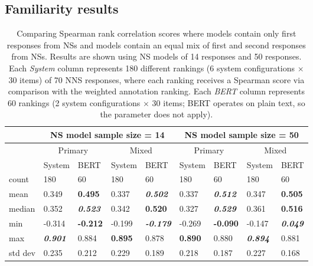 \subsection{Familiarity results}
\label{sec:familiarity-results}

\begin{table}[htb!]
\begin{center}
\begin{tabular}{|l||l|l||l|l||l|l||l|l|}
\hline
 & \multicolumn{4}{c||}{NS model sample size = 14} & \multicolumn{4}{c|}{NS model sample size = 50} \\
 \hline
 & \multicolumn{2}{c||}{Primary} & \multicolumn{2}{c||}{Mixed} & \multicolumn{2}{c||}{Primary} & \multicolumn{2}{c|}{Mixed} \\
\hline
		& System & BERT 	& System 	& BERT 						& System & BERT 	& System & BERT \\
\hline
\hline
count 	& 180 	& 60 		& 180 		& 60 						& 180 	& 60 		& 180 & 60 \\
\hline
mean 	& 0.349 & \textbf{0.495} & 0.337 & \textit{\textbf{0.502}} 	& 0.337 & \textit{\textbf{0.512}} 	& 0.347 & \textbf{0.505} \\
\hline
median 	& 0.352 & \textit{\textbf{0.523}} & 0.342 & \textbf{0.520}  & 0.327 & \textit{\textbf{0.529}} 	& 0.361 & \textbf{0.516}  \\
\hline
min & -0.314 & \textbf{-0.212} & -0.199 & \textit{\textbf{-0.179}}  & -0.269 & \textbf{-0.090} 	& -0.147 & \textit{\textbf{0.049}}  \\
\hline
max & \textit{\textbf{0.901}} & 0.884 & \textbf{0.895} & 0.878 		& \textbf{0.890} & 0.880 	& \textit{\textbf{0.894}} & 0.881 \\
\hline
std dev & 0.235 & 0.212 	& 0.229 	& 0.189 					& 0.218 & 0.187 	& 0.227 & 0.168 \\
\hline
\end{tabular}
\caption{\label{tab:primacy-results} Comparing Spearman rank correlation scores where  models contain only first responses from NSs and  models contain an equal mix of first and second responses from NSs. Results are shown using NS models of 14 responses and 50 responses. Each \textit{System} column represents 180 different rankings (6 system configurations $\times$ 30 items) of 70 NNS responses, where each ranking receives a Spearman score via comparison with the weighted annotation ranking. Each \textit{BERT} column represents 60 rankings (2 system configurations $\times$ 30 items; BERT operates on plain text, so the  parameter does not apply).
}
\end{center}
\end{table}


